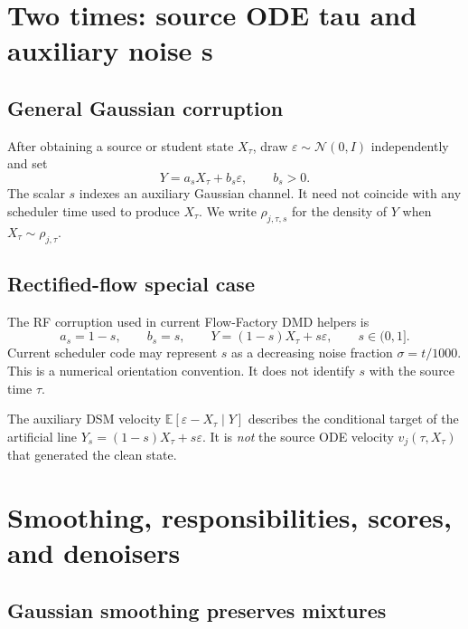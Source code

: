 \documentclass[11pt,a4paper]{article}
\newcommand{\E}{\mathbb{E}}
\newcommand{\N}{\mathcal{N}}
\theoremstyle{plain}
\theoremstyle{definition}
\begin{document}
\section{Two times: source ODE tau and auxiliary noise s}
\label{sec:two-times}

\subsection{General Gaussian corruption}

After obtaining a source or student state $X_\tau$, draw
$\varepsilon\sim\N(0,I)$ independently and set
\begin{equation}
Y=a_sX_\tau+b_s\varepsilon,
\qquad b_s>0.
\label{eq:general-corruption}
\end{equation}
The scalar $s$ indexes an auxiliary Gaussian channel.  It need not coincide with any scheduler
time used to produce $X_\tau$.  We write $\rho_{j,\tau,s}$ for the density of $Y$ when
$X_\tau\sim\rho_{j,\tau}$.

\subsection{Rectified-flow special case}

The RF corruption used in current Flow-Factory DMD helpers is
\begin{equation}
a_s=1-s,\qquad b_s=s,\qquad
Y=(1-s)X_\tau+s\varepsilon,\qquad s\in(0,1].
\label{eq:rf-corruption}
\end{equation}
Current scheduler code may represent $s$ as a decreasing noise fraction
$\sigma=t/1000$.  This is a numerical orientation convention.  It does not identify $s$ with
the source time $\tau$.

\begin{tcolorbox}[colback=red!4,colframe=red!45!black,title=Two-time warning]
The auxiliary DSM velocity
$\E[\varepsilon-X_\tau\mid Y]$ describes the conditional target of the artificial line
$Y_s=(1-s)X_\tau+s\varepsilon$.  It is \emph{not} the source ODE velocity
$v_j(\tau,X_\tau)$ that generated the clean state.
\end{tcolorbox}

\section{Smoothing, responsibilities, scores, and denoisers}
\label{sec:identities}

\subsection{Gaussian smoothing preserves mixtures}
\end{document}
